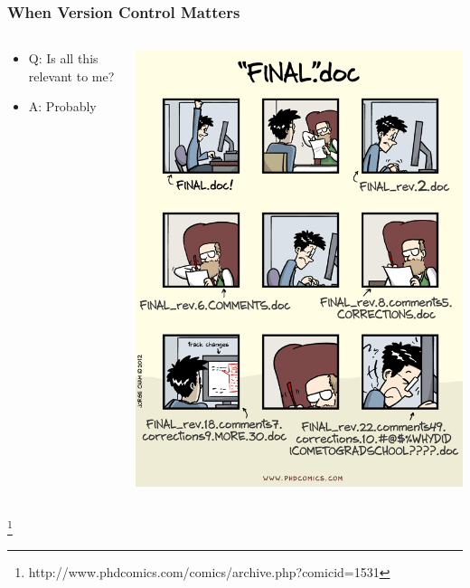 \documentclass{beamer}
\begin{document}
\begin{frame}
  \frametitle{When Version Control Matters}
  
  \begin{columns}
    \begin{column}{.5\textwidth}
      \begin{itemize}
      \item Q: Is all this relevant to me?
      \item A: Probably 
      \end{itemize} 
    \end{column}
    
    \begin{column}{.5\textwidth}
        \centering
        \includegraphics[height=.8\textheight]{img/final} 
    \end{column}
  \end{columns}
  \footnote{http://www.phdcomics.com/comics/archive.php?comicid=1531}
\end{frame}
\end{document}
